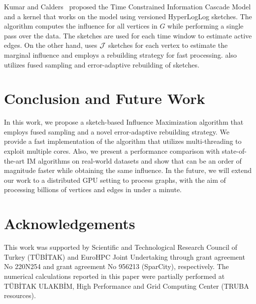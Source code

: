 \documentclass[final,5p,times,twocolumn]{elsarticle}
\newcommand\acro{{\sc{HyperFuseR\xspace}\xspace}\xspace}
\begin{document}
Kumar and Calders~\cite{kumar2017information} proposed the Time Constrained Information Cascade Model and a kernel that works on the model using versioned HyperLogLog sketches. The algorithm computes the influence for all vertices in $G$ while performing a single pass over the data. The sketches are used for each time window to estimate active edges. On the other hand, \acro uses ${\cal J}$ sketches for each vertex to estimate the marginal influence and employs a rebuilding strategy for fast processing. \acro also utilizes fused sampling and error-adaptive rebuilding of sketches.

\section{Conclusion and Future Work}\label{sec:conclusion}

In this work, we propose a sketch-based Influence Maximization algorithm that employs fused sampling and a novel error-adaptive rebuilding strategy. We provide a fast implementation of the algorithm that utilizes multi-threading to exploit multiple cores. Also, we present a performance comparison with state-of-the-art IM algorithms on real-world datasets and show that \acro{} can be an order of magnitude faster while obtaining the same influence. 
In the future, we will extend our work to a distributed GPU setting to process graphs, with the aim of processing billions of vertices and edges in under a minute. 



\section*{Acknowledgements}

This work was supported by Scientific and Technological Research Council of Turkey (TÜBİTAK) and EuroHPC Joint Undertaking through grant agreement No 220N254 and grant agreement No 956213 (SparCity), respectively. The numerical calculations reported in this paper were partially performed at T{\"{U}}B\.{I}TAK ULAKB\.{I}M, High Performance and Grid Computing Center (TRUBA resources).

\end{document}
